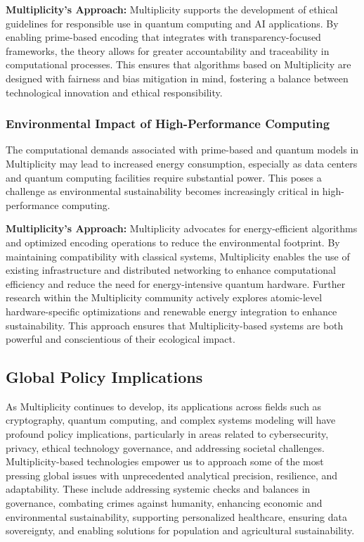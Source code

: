 \documentclass{article}
\theoremstyle{plain}
\begin{document}
\textbf{Multiplicity’s Approach:} Multiplicity supports the development of ethical guidelines for responsible use in quantum computing and AI applications. By enabling prime-based encoding that integrates with transparency-focused frameworks, the theory allows for greater accountability and traceability in computational processes. This ensures that algorithms based on Multiplicity are designed with fairness and bias mitigation in mind, fostering a balance between technological innovation and ethical responsibility.

\subsubsection{Environmental Impact of High-Performance Computing}
The computational demands associated with prime-based and quantum models in Multiplicity may lead to increased energy consumption, especially as data centers and quantum computing facilities require substantial power. This poses a challenge as environmental sustainability becomes increasingly critical in high-performance computing.

\textbf{Multiplicity’s Approach:} Multiplicity advocates for energy-efficient algorithms and optimized encoding operations to reduce the environmental footprint. By maintaining compatibility with classical systems, Multiplicity enables the use of existing infrastructure and distributed networking to enhance computational efficiency and reduce the need for energy-intensive quantum hardware. Further research within the Multiplicity community actively explores atomic-level hardware-specific optimizations and renewable energy integration to enhance sustainability. This approach ensures that Multiplicity-based systems are both powerful and conscientious of their ecological impact.

\subsection{Global Policy Implications}

As Multiplicity continues to develop, its applications across fields such as cryptography, quantum computing, and complex systems modeling will have profound policy implications, particularly in areas related to cybersecurity, privacy, ethical technology governance, and addressing societal challenges. Multiplicity-based technologies empower us to approach some of the most pressing global issues with unprecedented analytical precision, resilience, and adaptability. These include addressing systemic checks and balances in governance, combating crimes against humanity, enhancing economic and environmental sustainability, supporting personalized healthcare, ensuring data sovereignty, and enabling solutions for population and agricultural sustainability.
\end{document}

